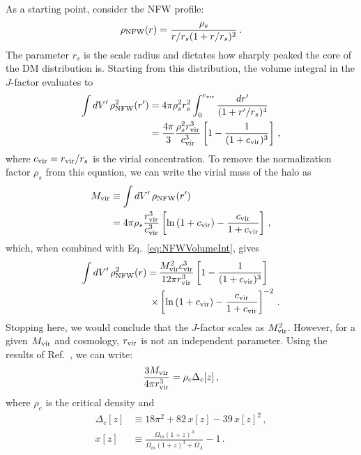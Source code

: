 As a starting point, consider the NFW profile:
\begin{equation}
\rho_{\rm NFW}(r) = \frac{\rho_s}{r/r_s(1+r/r_s)^2}\,.
\end{equation}
The parameter $r_s$ is the scale radius and dictates how sharply peaked the core of the DM distribution is.
Starting from this distribution, the volume integral in the $J$-factor evaluates to
\begin{equation}\begin{aligned}
\int dV'\, \rho_{\rm NFW}^2(r') &= 4\pi \rho_s^2 r_s^2 \int_0^{r_{\rm vir}} \frac{dr'}{(1+r'/r_s)^4} \\
&= \frac{4\pi}{3} \frac{\rho_s^2 r_{\rm vir}^3}{c_{\rm vir}^3} \left[ 1 - \frac{1}{(1+c_{\rm vir})^3} \right]\,,
\label{eq:NFWVolumeInt}
\end{aligned}\end{equation}
where $c_{\rm vir} = r_{\rm vir}/r_s$ is the virial concentration.  To remove the normalization factor $\rho_s$ from this equation, we can write the virial mass of the halo as
\begin{equation}\begin{aligned}
M_{\rm vir} &\equiv \int dV'\, \rho_{\rm NFW}(r') \\
&= 4\pi \rho_s \frac{r_{\rm vir}^3}{c_{\rm vir}^3} \left[ \ln \left( 1 + c_{\rm vir} \right) - \frac{c_{\rm vir}}{1+c_{\rm vir}} \right]\,,
\end{aligned}\end{equation}
which, when combined with Eq.~\ref{eq:NFWVolumeInt}, gives
\begin{equation}\begin{aligned}
\int dV'\, \rho_{\rm NFW}^2(r)
=\,&\frac{M_{\rm vir}^2 c_{\rm vir}^3}{12\pi r_{\rm vir}^3} \left[ 1 - \frac{1}{(1+c_{\rm vir})^3} \right] \\
\times &\left[ \ln \left( 1 + c_{\rm vir} \right) - \frac{c_{\rm vir}}{1+c_{\rm vir}} \right]^{-2}\,.
\end{aligned}\end{equation}
Stopping here, we would conclude that the $J$-factor scales as $M_{\rm vir}^2$.  However, for a given $M_{\rm vir}$ and cosmology, $r_{\rm vir}$ is not an independent parameter. Using the results of Ref.~\cite{Bryan:1997dn}, we can write:
\begin{equation}
\frac{3M_{\rm vir}}{4\pi r_{\rm vir}^3} = \rho_c \Delta_c[z]\,,
\end{equation}
where $\rho_c$ is the critical density and 
\begin{equation}\begin{aligned}
\Delta_c[z] &\equiv  18\pi^2 + 82\,x[z] - 39\,x[z]^2\,, \\
x[z] &\equiv \frac{\Omega_m \left( 1 + z \right)^3}{\Omega_m \left( 1 + z \right)^3 + \Omega_{\Lambda}} - 1\,.
\end{aligned}\end{equation}
